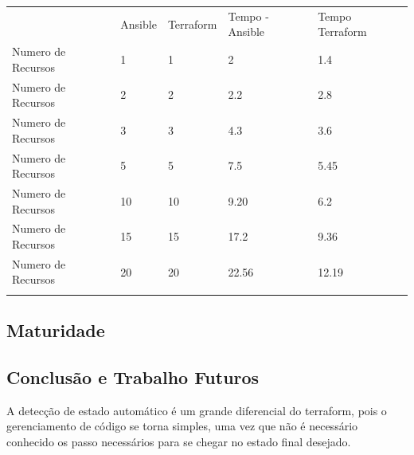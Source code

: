 \begin{table}[ht]
\begin{tabular}{lllll}
                         & Ansible & Terraform & Tempo - Ansible & Tempo Terraform \\
Numero    de    Recursos & 1       & 1         & 2               & 1.4             \\
Numero    de    Recursos & 2       & 2         & 2.2             & 2.8             \\
Numero    de    Recursos & 3       & 3         & 4.3             & 3.6             \\
Numero    de    Recursos & 5       & 5         & 7.5             & 5.45            \\
Numero    de    Recursos & 10      & 10        & 9.20            & 6.2             \\
Numero    de    Recursos & 15      & 15        & 17.2            & 9.36            \\
Numero    de    Recursos & 20      & 20        & 22.56           & 12.19           \\
                         &         &           &                 &                
\end{tabular}
\end{table}

























\subsection{Maturidade}



\subsection{Conclusão e Trabalho Futuros}
A detecção de estado automático é um grande diferencial do terraform, pois o gerenciamento de código se torna simples, uma vez que não é necessário conhecido os passo necessários para se chegar no estado final desejado.

